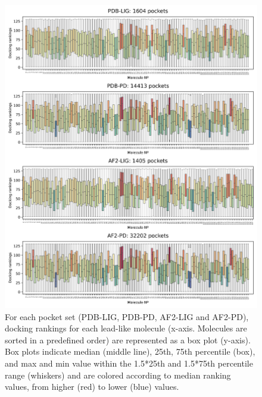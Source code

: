 \begin{figure}[htbp]
  \centering
  \includegraphics[width=0.85\linewidth]{figures/PocketVec/Supplementary/FigS22.png}
  \caption{
  For each pocket set (PDB-LIG, PDB-PD, AF2-LIG and AF2-PD), docking rankings for each lead-like molecule (x-axis. Molecules are sorted in a predefined order) are represented as a box plot (y-axis). Box plots indicate median (middle line), 25th, 75th percentile (box), and max and min value within the 1.5*25th and 1.5*75th percentile range (whiskers) and are colored according to median ranking values, from higher (red) to lower (blue) values.      
  }
  \label{PocketVec_FigS22}
\end{figure}


